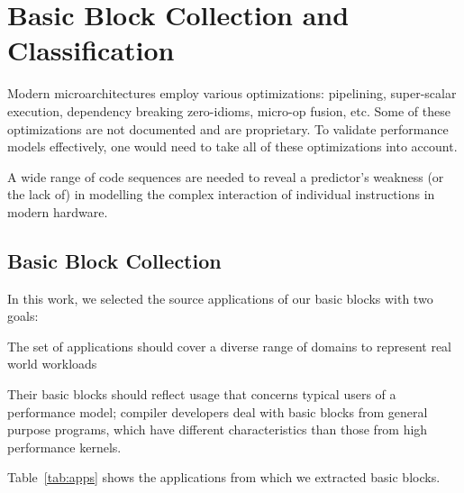 \section{Basic Block Collection and Classification}
Modern microarchitectures employ various optimizations:
pipelining, super-scalar execution, dependency breaking zero-idioms, micro-op fusion, etc.
Some of these optimizations are not documented and are proprietary.
To validate performance models effectively, one would need to take
all of these optimizations into account.

A wide range of code sequences are needed to reveal a predictor's 
weakness (or the lack of) in modelling the complex interaction of 
individual instructions in modern hardware. 

\subsection{Basic Block Collection}
In this work, we selected the source applications of our basic blocks with two goals:
\begin{enumerate*}
    \item The set of applications should cover a diverse range
of domains to represent real world workloads
    \item Their basic blocks should reflect usage that concerns typical users of a performance model;
    compiler developers deal with
    basic blocks from general purpose programs,
    which have different characteristics
    than those from 
    high performance kernels. 
\end{enumerate*}
Table~\ref{tab:apps} shows the applications from which we extracted basic blocks.


